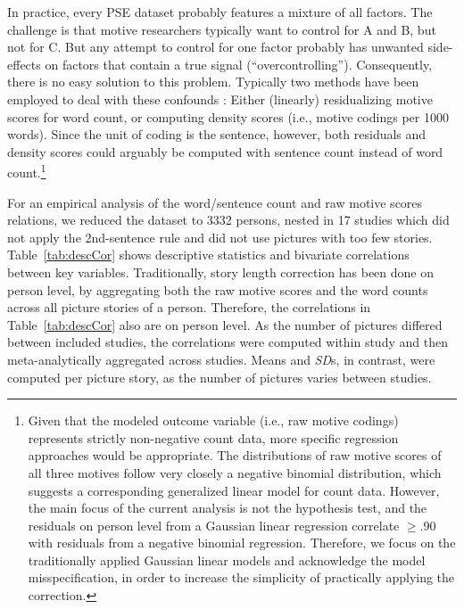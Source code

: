 \documentclass[man,a4paper,mask]{apa6}
\begin{document}
{In practice, every PSE dataset probably features a mixture of all factors. The challenge is that motive researchers typically want to control for A and B, but not for C. But any attempt to control for one factor probably has unwanted side-effects on factors that contain a true signal (``overcontrolling''). Consequently, there is no easy solution to this problem. Typically two methods have been employed to deal with these confounds \parencite{schultheiss_MeasuringImplicitMotives_2007}: Either (linearly) residualizing motive scores for word count, or computing density scores (i.e., motive codings per 1000 words). Since the unit of coding is the sentence, however, both residuals and density scores could arguably be computed with sentence count instead of word count.\footnote{Given that the modeled outcome variable (i.e., raw motive codings) represents strictly non-negative count data, more specific regression approaches would be appropriate. The distributions of raw motive scores of all three motives follow very closely a negative binomial distribution, which suggests a corresponding generalized linear model for count data. However, the main focus of the current analysis is not the hypothesis test, and the residuals on person level from a Gaussian linear regression correlate $\geq .90$ with residuals from a negative binomial regression. Therefore, we focus on the traditionally applied Gaussian linear models and acknowledge the model misspecification, in order to increase the simplicity of practically applying the correction.}

For an empirical analysis of the word/sentence count and raw motive scores relations, we reduced the dataset to 3332 persons, nested in 17 studies which did not apply the 2nd-sentence rule and did not use pictures with too few stories. 
Table~\ref{tab:descCor} shows descriptive statistics and bivariate correlations between key variables. 
Traditionally, story length correction has been done on person level, by aggregating both the raw motive scores and the word counts across all picture stories of a person. 
Therefore, the correlations in Table~\ref{tab:descCor} also are on person level. 
As the number of pictures differed between included studies, the correlations were computed within study and then meta-analytically aggregated across studies. Means and \emph{SD}s, in contrast, were computed per picture story, as the number of pictures varies between studies. 


}
\end{document}
